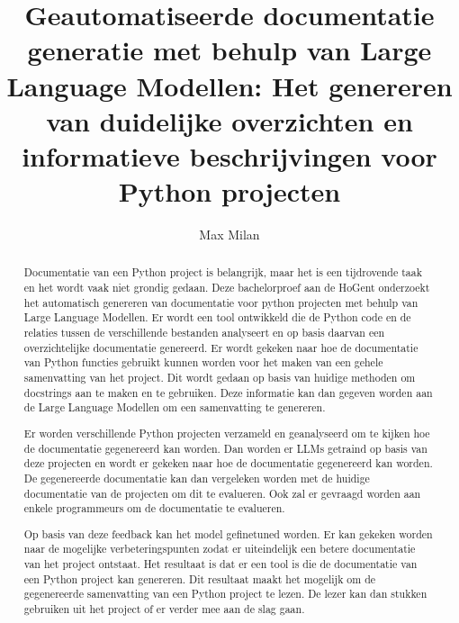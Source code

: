 \documentclass{hogent-article}
\title{Geautomatiseerde documentatie generatie met behulp van Large Language Modellen: Het genereren van duidelijke overzichten en informatieve beschrijvingen voor Python projecten}
\author{Max Milan}
\begin{document}
\begin{abstract}
Documentatie van een Python project is belangrijk, maar het is een tijdrovende taak en het wordt vaak niet grondig gedaan.
Deze bachelorproef aan de HoGent onderzoekt het automatisch genereren van documentatie voor python projecten met behulp van Large Language Modellen.
Er wordt een tool ontwikkeld die de Python code en de relaties tussen de verschillende bestanden analyseert en op basis daarvan een overzichtelijke documentatie genereerd.
Er wordt gekeken naar hoe de documentatie van Python functies gebruikt kunnen worden voor het maken van een gehele samenvatting van het project.
Dit wordt gedaan op basis van huidige methoden om docstrings aan te maken en te gebruiken.
Deze informatie kan dan gegeven worden aan de Large Language Modellen om een samenvatting te genereren.

Er worden verschillende Python projecten verzameld en geanalyseerd om te kijken hoe de documentatie gegenereerd kan worden.
Dan worden er LLMs getraind op basis van deze projecten en wordt er gekeken naar hoe de documentatie gegenereerd kan worden.
De gegenereerde documentatie kan dan vergeleken worden met de huidige documentatie van de projecten om dit te evalueren.
Ook zal er gevraagd worden aan enkele programmeurs om de documentatie te evalueren.

Op basis van deze feedback kan het model gefinetuned worden. Er kan gekeken worden naar de mogelijke verbeteringspunten zodat er uiteindelijk een betere documentatie van het project ontstaat.
Het resultaat is dat er een tool is die de documentatie van een Python project kan genereren.
Dit resultaat maakt het mogelijk om de gegenereerde samenvatting van een Python project te lezen. De lezer kan dan stukken gebruiken uit het project of er verder mee aan de slag gaan.
\end{abstract}

\tableofcontents



\printbibliography[heading=bibintec]
\end{document}
